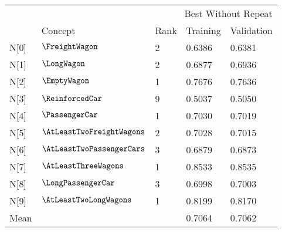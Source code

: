 \begin{tabular}{lllll}
\toprule
 & \multicolumn{4}{r}{Best Without Repeat} \\
 & Concept & Rank & Training & Validation \\
\midrule
N[0] & $\FreightWagon$ & 2 & 0.6386 & 0.6381 \\
N[1] & $\LongWagon$ & 2 & 0.6877 & 0.6936 \\
N[2] & $\EmptyWagon$ & 1 & 0.7676 & 0.7636 \\
N[3] & $\ReinforcedCar$ & 9 & 0.5037 & 0.5050 \\
N[4] & $\PassengerCar$ & 1 & 0.7030 & 0.7019 \\
N[5] & $\AtLeastTwoFreightWagons$ & 2 & 0.7028 & 0.7015 \\
N[6] & $\AtLeastTwoPassengerCars$ & 3 & 0.6879 & 0.6873 \\
N[7] & $\AtLeastThreeWagons$ & 1 & 0.8533 & 0.8535 \\
N[8] & $\LongPassengerCar$ & 3 & 0.6998 & 0.7003 \\
N[9] & $\AtLeastTwoLongWagons$ & 1 & 0.8199 & 0.8170 \\
Mean &  &  & 0.7064 & 0.7062 \\
\bottomrule
\end{tabular}
